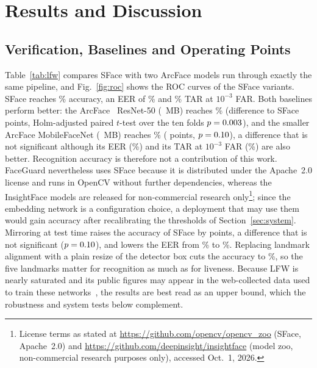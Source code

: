 \documentclass[journal]{IEEEtran}
\newcommand{\sys}{FaceGuard}
\begin{document}
\section{Results and Discussion}\label{sec:results}

\subsection{Verification, Baselines and Operating Points}
Table~\ref{tab:lfw} compares SFace with two ArcFace models run through exactly the same pipeline, and Fig.~\ref{fig:roc} shows the ROC curves of the SFace variants. SFace reaches \lfwAccFull\% accuracy, an EER of \lfwEerFull\% and \lfwTarThreeFull\% TAR at $10^{-3}$ FAR. Both baselines perform better: the ArcFace~\cite{deng2019arcface} ResNet-50 (\baseRfiftyMb~MB) reaches \baseRfiftyAcc\% (difference to SFace \effSfaceRfifty{} points, Holm-adjusted paired $t$-test over the ten folds $p=0.003$), and the smaller ArcFace MobileFaceNet (\baseMbfMb~MB) reaches \baseMbfAcc\% (\effSfaceMbf{} points, $p=0.10$), a difference that is not significant although its EER (\baseMbfEer\%) and its TAR at $10^{-3}$ FAR (\baseMbfTarThree\%) are also better. Recognition accuracy is therefore not a contribution of this work. \sys{} nevertheless uses SFace because it is distributed under the Apache~2.0 license and runs in OpenCV without further dependencies, whereas the InsightFace models are released for non-commercial research only\footnote{License terms as stated at \url{https://github.com/opencv/opencv_zoo} (SFace, Apache~2.0) and \url{https://github.com/deepinsight/insightface} (model zoo, non-commercial research purposes only), accessed Oct.~1, 2026.}; since the embedding network is a configuration choice, a deployment that may use them would gain accuracy after recalibrating the thresholds of Section~\ref{sec:system}. Mirroring at test time raises the accuracy of SFace by \effTta{} points, a difference that is not significant ($p=0.10$), and lowers the EER from \lfwEerNoTTA\% to \lfwEerFull\%. Replacing landmark alignment with a plain resize of the detector box cuts the accuracy to \lfwAccNoAlign\%, so the five landmarks matter for recognition as much as for liveness. Because LFW is nearly saturated and its public figures may appear in the web-collected data used to train these networks~\cite{zhu2021webface260m}, the results are best read as an upper bound, which the robustness and system tests below complement.
\end{document}
